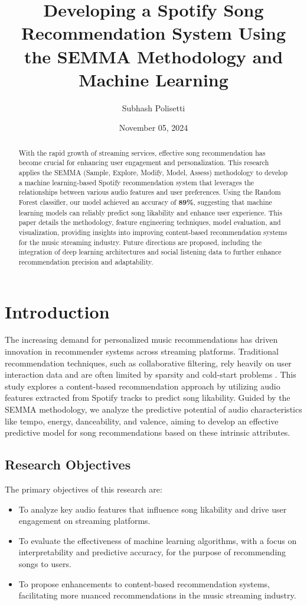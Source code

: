 \documentclass[12pt]{article}
\title{Developing a Spotify Song Recommendation System Using the SEMMA Methodology and Machine Learning}
\author{Subhash Polisetti}
\date{November 05, 2024}
\begin{document}
\maketitle

\begin{abstract}
With the rapid growth of streaming services, effective song recommendation has become crucial for enhancing user engagement and personalization. This research applies the SEMMA (Sample, Explore, Modify, Model, Assess) methodology to develop a machine learning-based Spotify recommendation system that leverages the relationships between various audio features and user preferences. Using the Random Forest classifier, our model achieved an accuracy of \textbf{89\%}, suggesting that machine learning models can reliably predict song likability and enhance user experience. This paper details the methodology, feature engineering techniques, model evaluation, and visualization, providing insights into improving content-based recommendation systems for the music streaming industry. Future directions are proposed, including the integration of deep learning architectures and social listening data to further enhance recommendation precision and adaptability.

\end{abstract}

\section{Introduction}
The increasing demand for personalized music recommendations has driven innovation in recommender systems across streaming platforms. Traditional recommendation techniques, such as collaborative filtering, rely heavily on user interaction data and are often limited by sparsity and cold-start problems \cite{collaborative_filtering}. This study explores a content-based recommendation approach by utilizing audio features extracted from Spotify tracks to predict song likability. Guided by the SEMMA methodology, we analyze the predictive potential of audio characteristics like tempo, energy, danceability, and valence, aiming to develop an effective predictive model for song recommendations based on these intrinsic attributes.

\subsection{Research Objectives}
The primary objectives of this research are:
\begin{itemize}
    \item To analyze key audio features that influence song likability and drive user engagement on streaming platforms.
    \item To evaluate the effectiveness of machine learning algorithms, with a focus on interpretability and predictive accuracy, for the purpose of recommending songs to users.
    \item To propose enhancements to content-based recommendation systems, facilitating more nuanced recommendations in the music streaming industry.
\end{itemize}
\end{document}
